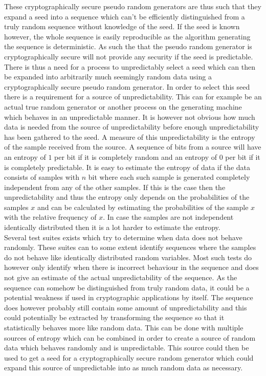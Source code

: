 \documentclass[a4paper,11pt]{report}
\begin{document}
\noindent
These cryptographically secure pseudo random generators are thus such that 
they expand a seed into a sequence which can't be efficiently distinguished 
from a truly random sequence without knowledge of the seed. If the seed is 
known however, the whole sequence is easily reproducible as the algorithm 
generating the sequence is deterministic. As such the that the pseudo random
generator is cryptographically secure will not provide any security if the seed
is predictable. There is thus a need for a process to unpredictably select a 
seed which can then be expanded into arbitrarily much seemingly random data
using a cryptographically secure pseudo random generator. In order to select
this seed there is a requirement for a source of unpredictability. This can
for example be an actual true random generator or another process on the 
generating machine which behaves in an unpredictable manner. It is however not
obvious how much data is needed from the source of unpredictability before 
enough unpredictability has been gathered to the seed. A measure of this 
unpredictability is the entropy of the sample received from the source.
A sequence of bits from a source will have an entropy of $1$ per bit if
it is completely random and an entropy of $0$ per bit if it is 
completely predictable. It is easy to estimate the entropy of 
data if the data consists of samples with $n$ bit where each such sample is
generated completely independent from any of the other samples. If this is the 
case then the unpredictability and thus the entropy only depends on the 
probabilities of the samples $x$ and can be calculated by estimating the
probabilities of the sample $x$ with the relative frequency of $x$. 
In case the samples are not independent identically distributed then it is a 
lot harder to estimate the entropy. \\

\noindent
Several test suites exists which try to determine when data does not behave 
randomly. These suites can to some extent 
identify sequences where the samples do not behave like identically distributed
random variables. Most such tests do however only identify when there is 
incorrect behaviour in the sequence and does not give an estimate of the actual
unpredictability of the sequence. As the sequence can somehow be distinguished 
from truly random data, it could be a potential weakness if used in 
cryptographic applications by itself. The sequence does however probably still
contain some amount of unpredictability and this could potentially be extracted
by transforming the sequence so that it statistically behaves more like random
data. This can be done with multiple sources of entropy which can be combined 
in order to create a source of random data which behaves randomly and is 
unpredictable. This source could then be used to get a seed for a
cryptographically secure random generator which could expand this source of 
unpredictable into as much random data as necessary.\\
\end{document}
